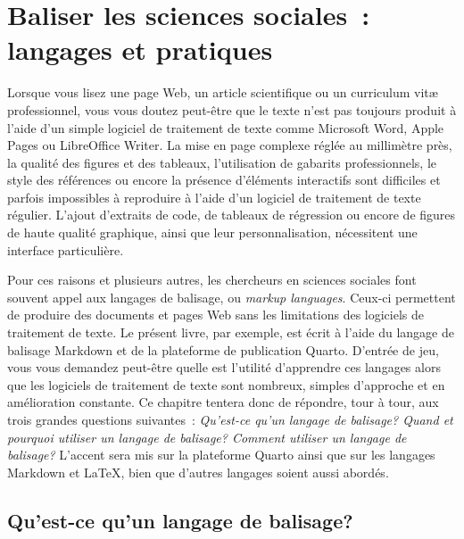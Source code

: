 \documentclass[
  letterpaper,
]{scrbook}
\begin{document}

\hypertarget{sec-chap5}{%
\chapter{Baliser les sciences sociales~: langages et
pratiques}\label{sec-chap5}}

Lorsque vous lisez une page Web, un article scientifique ou un
curriculum vitæ professionnel, vous vous doutez peut-être que le texte
n'est pas toujours produit à l'aide d'un simple logiciel de traitement
de texte comme Microsoft Word, Apple Pages ou LibreOffice Writer. La
mise en page complexe réglée au millimètre près, la qualité des figures
et des tableaux, l'utilisation de gabarits professionnels, le style des
références ou encore la présence d'éléments interactifs sont difficiles
et parfois impossibles à reproduire à l'aide d'un logiciel de traitement
de texte régulier. L'ajout d'extraits de code, de tableaux de régression
ou encore de figures de haute qualité graphique, ainsi que leur
personnalisation, nécessitent une interface particulière.

Pour ces raisons et plusieurs autres, les chercheurs en sciences
sociales font souvent appel aux langages de balisage, ou \emph{markup
languages}. Ceux-ci permettent de produire des documents et pages Web
sans les limitations des logiciels de traitement de texte. Le présent
livre, par exemple, est écrit à l'aide du langage de balisage Markdown
et de la plateforme de publication Quarto. D'entrée de jeu, vous vous
demandez peut-être quelle est l'utilité d'apprendre ces langages alors
que les logiciels de traitement de texte sont nombreux, simples
d'approche et en amélioration constante. Ce chapitre tentera donc de
répondre, tour à tour, aux trois grandes questions suivantes~:
\emph{Qu'est-ce qu'un langage de balisage? Quand et pourquoi utiliser un
langage de balisage? Comment utiliser un langage de balisage?} L'accent
sera mis sur la plateforme Quarto ainsi que sur les langages Markdown et
\LaTeX, bien que d'autres langages soient aussi abordés.

\hypertarget{quest-ce-quun-langage-de-balisage}{%
\section{Qu'est-ce qu'un langage de
balisage?}\label{quest-ce-quun-langage-de-balisage}}
\end{document}
